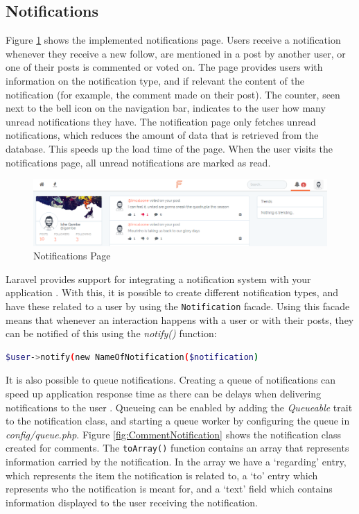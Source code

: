 \subsection{Notifications}
Figure \ref{fig:NotificationsPage} shows the implemented notifications page. Users receive a notification whenever they receive a new follow, are mentioned in a post by another user, or one of their posts is commented or voted on. The page provides users with information on the notification type, and if relevant the content of the notification (for example, the comment made on their post). The counter, seen next to the bell icon on the navigation bar, indicates to the user how many unread notifications they have. The notification page only fetches unread notifications, which reduces the amount of data that is retrieved from the database. This speeds up the load time of the page. When the user visits the notifications page, all unread notifications are marked as read. 

\begin{figure}[H]
\centering
\includegraphics[width=\textwidth]{Images/Implementation/NotificationsPage}
\caption{Notifications Page}
\label{fig:NotificationsPage}
\end{figure}

Laravel provides support for integrating a notification system with your application \cite{Laravel:Notifications}. With this, it is possible to create different notification types, and have these related to a user by using the \texttt{Notification} facade. Using this facade means that whenever an interaction happens with a user or with their posts, they can be notified of this using the \textit{notify()} function:

\begin{lstlisting}[language=bash]
	$user->notify(new NameOfNotification($notification)
\end{lstlisting}

 It is also possible to queue notifications. Creating a queue of notifications can speed up application response time as there can be delays when delivering notifications to the user \cite{Laravel:Notifications, Laravel:Queues}. Queueing can be enabled by adding the \textit{Queueable} trait to the notification class, and starting a queue worker by configuring the queue in \textit{config/queue.php}. Figure \ref{fig:CommentNotification} shows the notification class created for comments. The \texttt{toArray()} function contains an array that represents information carried by the notification. In the array we have a `regarding' entry, which represents the item the notification is related to, a `to' entry which represents who the notification is meant for, and a `text' field which contains information displayed to the user receiving the notification.


